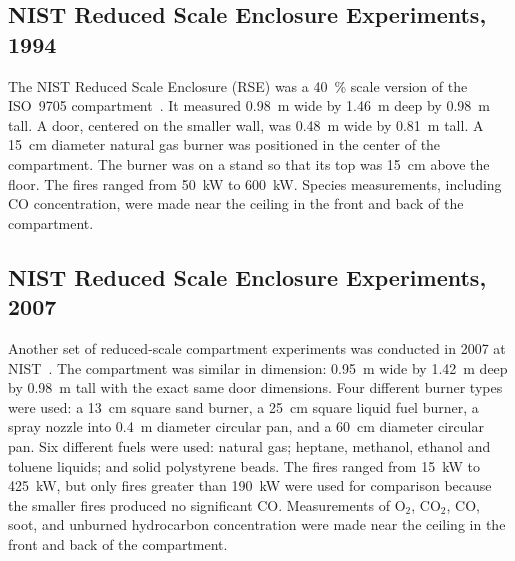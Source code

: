 \subsection{NIST Reduced Scale Enclosure Experiments, 1994}
\label{NIST_RSE_1994_Description}

The NIST Reduced Scale Enclosure (RSE) was a 40~\% scale version of the ISO~9705 compartment~\cite{Bryner:1}. It measured 0.98~m wide by 1.46~m deep by 0.98~m tall. A door, centered on the smaller wall, was 0.48~m wide by 0.81~m tall.  A 15~cm diameter natural gas burner was positioned in the center of the compartment.  The burner was on a stand so that its top was 15~cm above the floor. The fires ranged from 50~kW to 600~kW. Species measurements, including CO concentration, were made near the ceiling in the front and back of the compartment.

\subsection{NIST Reduced Scale Enclosure Experiments, 2007}
\label{NIST_RSE_2007_Description}

Another set of reduced-scale compartment experiments was conducted in 2007 at NIST~\cite{Bundy:1}. The compartment was similar in dimension: 0.95~m wide by 1.42~m deep by 0.98~m tall with the exact same door dimensions. Four different burner types were used: a 13~cm square sand burner, a 25~cm square liquid fuel burner, a spray nozzle into 0.4~m diameter circular pan, and a 60~cm diameter circular pan. Six different fuels were used: natural gas; heptane, methanol, ethanol and toluene liquids; and solid polystyrene beads. The fires ranged from 15~kW to 425~kW, but only fires greater than 190~kW were used for comparison because the smaller fires produced no significant CO. Measurements of O$_2$, CO$_2$, CO, soot, and unburned hydrocarbon concentration were made near the ceiling in the front and back of the compartment.

